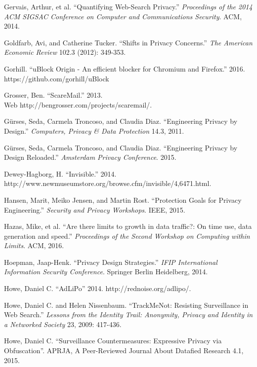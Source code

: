 \documentclass[conference]{IEEEtran}
\begin{document}
\begin{thebibliography}{99}
 Gervais, Arthur, et al. “Quantifying Web-Search Privacy.” \textit{Proceedings of the 2014 ACM SIGSAC Conference on Computer and Communications Security}. ACM, 2014.

 Goldfarb, Avi, and Catherine Tucker. “Shifts in Privacy Concerns.” \textit{The American Economic Review} 102.3 (2012): 349-353.

 Gorhill. “uBlock Origin - An efficient blocker for Chromium and Firefox.” 2016. https://github.com/gorhill/uBlock

 Grosser, Ben. “ScareMail.” 2013.\\ Web http://bengrosser.com/projects/scaremail/.

 G\"urses, Seda, Carmela Troncoso, and Claudia Diaz. “Engineering Privacy by Design.” \textit{Computers, Privacy \& Data Protection} 14.3, 2011.

 G\"urses, Seda, Carmela Troncoso, and Claudia Diaz. “Engineering Privacy by Design Reloaded.” \textit{Amsterdam Privacy Conference}. 2015.

 Dewey-Hagborg, H. ``Invisible.'' 2014. \\ http://www.newmuseumstore.org/browse.cfm/invisible/4,6471.html.

 Hansen, Marit, Meiko Jensen, and Martin Rost. “Protection Goals for Privacy Engineering.” \textit{Security and Privacy Workshops}. IEEE, 2015.

 Hazas, Mike, et al. “Are there limits to growth in data traffic?: On time use, data generation and speed.” \textit{Proceedings of the Second Workshop on Computing within Limits}. ACM, 2016.

 Hoepman, Jaap-Henk. “Privacy Design Strategies.” \textit{IFIP International Information Security Conference}. Springer Berlin Heidelberg, 2014.

 Howe, Daniel C. “AdLiPo” 2014. http://rednoise.org/adlipo/.

 Howe, Daniel C. and Helen Nissenbaum. “TrackMeNot: Resisting Surveillance in Web Search.” \textit{Lessons from the Identity Trail: Anonymity, Privacy and Identity in a Networked Society} 23, 2009: 417-436.

 Howe, Daniel C. “Surveillance Countermeasures: Expressive Privacy via Obfuscation”. APRJA, A Peer-Reviewed Journal About Datafied Research 4.1, 2015.


\end{thebibliography}
\end{document}
